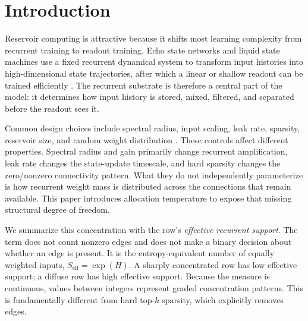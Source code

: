 \documentclass[preprint,12pt,authoryear]{elsarticle}
\begin{document}
\section{Introduction}
\label{sec:introduction}

Reservoir computing is attractive because it shifts most learning complexity from recurrent training to readout training. Echo state networks and liquid state machines use a fixed recurrent dynamical system to transform input histories into high-dimensional state trajectories, after which a linear or shallow readout can be trained efficiently \citep{jaeger2001echo,maass2002real,lukosevicius2009reservoir}. The recurrent substrate is therefore a central part of the model: it determines how input history is stored, mixed, filtered, and separated before the readout sees it.

Common design choices include spectral radius, input scaling, leak rate, sparsity, reservoir size, and random weight distribution \citep{schrauwen2007overview,lukosevicius2009reservoir,yildiz2012revisiting}. These controls affect different properties. Spectral radius and gain primarily change recurrent amplification, leak rate changes the state-update timescale, and hard sparsity changes the zero/nonzero connectivity pattern. What they do not independently parameterize is how recurrent weight mass is distributed across the connections that remain available. This paper introduces allocation temperature to expose that missing structural degree of freedom.

We summarize this concentration with the row's \emph{effective recurrent support}. The term does not count nonzero edges and does not make a binary decision about whether an edge is present. It is the entropy-equivalent number of equally weighted inputs, $S_{\mathrm{eff}}=\exp(H)$. A sharply concentrated row has low effective support; a diffuse row has high effective support. Because the measure is continuous, values between integers represent graded concentration patterns. This is fundamentally different from hard top-$k$ sparsity, which explicitly removes edges.
\end{document}
